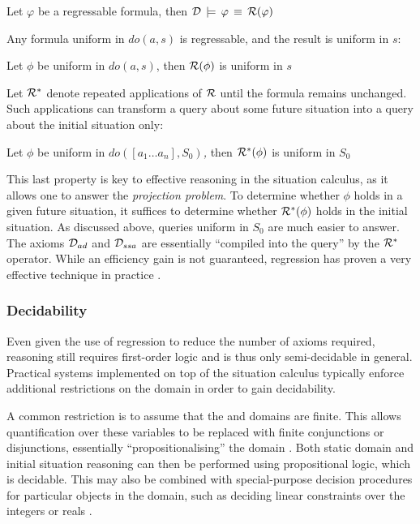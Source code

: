 \begin{prop}
Let $\varphi$ be a regressable formula, then $\mathcal{D}\,\models\,\varphi\,\equiv\,\mathcal{R}(\varphi)$ 
\end{prop}
Any formula uniform in $do(a,s)$ is regressable, and the result is
uniform in $s$:

\begin{prop}
Let $\phi$ be uniform in $do(a,s)$, then $\mathcal{R}(\phi)$ is uniform
in $s$ 
\end{prop}
Let $\mathcal{R}^{*}$ denote repeated applications of $\mathcal{R}$ until the
formula remains unchanged. Such applications can transform a query
about some future situation into a query about the initial situation
only:

\begin{prop}
Let $\phi$ be uniform in \emph{$do([a_{1}\dots a_{n}],S_{0})$,}
then $\mathcal{R}^{*}(\phi)$ is uniform in $S_{0}$ 
\end{prop}
This last property is key to effective reasoning in the situation
calculus, as it allows one to answer the \emph{projection problem}.
To determine whether $\phi$ holds in a given future situation, it
suffices to determine whether $\mathcal{R}^{*}(\phi)$ holds in the initial
situation. As discussed above, queries uniform in $S_{0}$ are much
easier to answer. The axioms $\mathcal{D}_{ad}$ and $\mathcal{D}_{ssa}$ are essentially
{}``compiled into the query'' by the $\mathcal{R}^{*}$ operator. While
an efficiency gain is not guaranteed, regression has proven a very
effective technique in practice \citep{levesque97golog,pirri99contributions_sitcalc}.


\subsubsection{Decidability}

Even given the use of regression to reduce the number of axioms required,
reasoning still requires first-order logic and is thus only semi-decidable
in general. Practical systems implemented on top of the situation
calculus typically enforce additional restrictions on the domain in
order to gain decidability.

A common restriction is to assume that the  and 
domains are finite. This allows quantification over these variables
to be replaced with finite conjunctions or disjunctions, essentially
{}``propositionalising'' the domain \citep{giacomo99impl_robots,reiter01kia,levesque04krr_book}.
Both static domain and initial situation reasoning can then be performed
using propositional logic, which is decidable. This may also be combined
with special-purpose decision procedures for particular objects in
the domain, such as deciding linear constraints over the integers
or reals \citep{reiter96sc_nat_conc,reiter01kia}.

